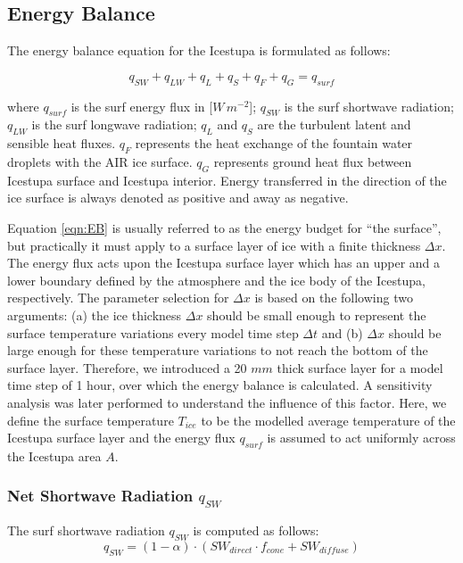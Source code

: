 \documentclass[utf8]{frontiersSCNS} %
\begin{document}
\subsection{Energy Balance} \label{section:EB}

The energy balance equation \citep{Hock_2005} for the Icestupa is formulated as follows:

\begin{equation} q_{SW} + q_{LW} + q_{L} + q_{S} + q_{F} + q_{G} = q_{surf} \label{eqn:EB} \end{equation}

where $q_{surf}$ is the surf energy flux in [$W\,m^{-2}$]; $q_{SW}$ is the surf shortwave radiation; $q_{LW}$ is the surf
longwave radiation; $q_{L}$ and $q_{S}$ are the turbulent latent and sensible heat fluxes. $q_{F}$ represents the heat
exchange of the fountain water droplets with the AIR ice surface. $q_{G}$ represents ground heat flux between Icestupa
surface and Icestupa interior. Energy transferred in the direction of the ice surface is always denoted as positive and
away as negative.  

Equation \ref{eqn:EB} is usually referred to as the energy budget for “the surface”, but practically it must apply to
a surface layer of ice with a finite thickness $\Delta x$. The energy flux acts upon the Icestupa surface layer which
has an upper and a lower boundary defined by the atmosphere and the ice body of the Icestupa, respectively. The
parameter selection for $\Delta x$ is based on the following two arguments: (a) the ice thickness $\Delta x$ should be
small enough to represent the surface temperature variations every model time step $\Delta t$ and (b) $\Delta x$ should
be large enough for these temperature variations to not reach the bottom of the surface layer.  Therefore, we introduced
a 20 $mm$ thick surface layer for a model time step of 1 hour, over which the energy balance is calculated. A
sensitivity analysis was later performed to understand the influence of this factor. Here, we define the surface
temperature $T_{ice}$ to be the modelled average temperature of the Icestupa surface layer and the energy flux $q_{surf}$
is assumed to act uniformly across the Icestupa area $A$.

\subsubsection{Net Shortwave Radiation \texorpdfstring{$q_{SW}$}{Lg}} The surf shortwave radiation $q_{SW}$ is computed
as follows:
\begin{equation} q_{SW} = (1- \alpha)\cdot (SW_{direct} \cdot f_{cone} + SW_{diffuse}) \label{eqn:SW} \end{equation}
\end{document}

